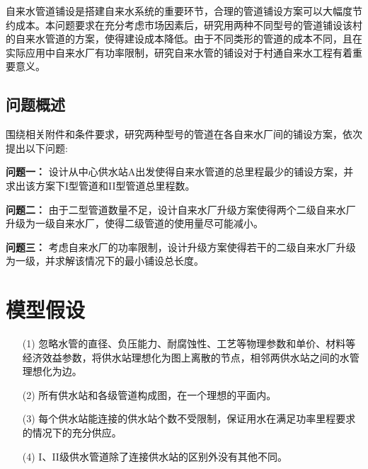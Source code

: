 \documentclass{whutmod}
\begin{document}
	自来水管道铺设是搭建自来水系统的重要环节，合理的管道铺设方案可以大幅度节约成本。本问题要求在充分考虑市场因素后，研究用两种不同型号的管道铺设该村的自来水管道的方案，使得建设成本降低。由于不同类形的管道的成本不同，且在实际应用中自来水厂有功率限制，研究自来水管的铺设对于村通自来水工程有着重要意义。
	
		\subsection{问题概述}
		    围绕相关附件和条件要求，研究两种型号的管道在各自来水厂间的铺设方案，依次提出以下问题:
		    
			\textbf{问题一：}
			设计从中心供水站A出发使得自来水管道的总里程最少的铺设方案，并求出该方案下I型管道和II型管道总里程数。
			
			\textbf{问题二：}
			由于二型管道数量不足，设计自来水厂升级方案使得两个二级自来水厂升级为一级自来水厂，使得二级管道的使用量尽可能减小。
			
			\textbf{问题三：}
            考虑自来水厂的功率限制，设计升级方案使得若干的二级自来水厂升级为一级，并求解该情况下的最小铺设总长度。
	
	\section{模型假设}
		\begin{itemize}                                             
		\item [(1)]忽略水管的直径、负压能力、耐腐蚀性、工艺等物理参数和单价、材料等经济效益参数，将供水站理想化为图上离散的节点，相邻两供水站之间的水管理想化为边。
		\item [(2)]所有供水站和各级管道构成图，在一个理想的平面内。
		\item[(3)]每个供水站能连接的供水站个数不受限制，保证用水在满足功率里程要求的情况下的充分供应。
		\item [(4)]I、II级供水管道除了连接供水站的区别外没有其他不同。
		\end{itemize}

		
\end{document}

